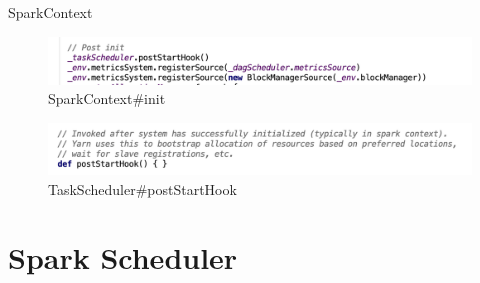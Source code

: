 \begin{frame}[plain,t]{SparkContext} %
	 \\  
	\begin{figure}
		\centering
		\includegraphics[width=0.9\linewidth]{images/app014}
		\caption{SparkContext\#init}
		\label{fig:app014}
	\end{figure}
	\begin{figure}
		\centering
		\includegraphics[width=0.9\linewidth]{images/app015}
		\caption{TaskScheduler\#postStartHook}
		\label{fig:app015}
	\end{figure}
	
	
\end{frame}


\section{Spark Scheduler}
